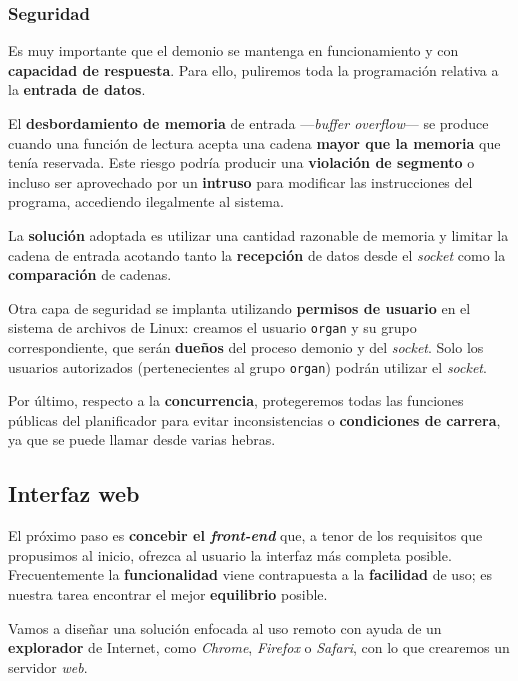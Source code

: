 \documentclass[10pt,a4paper]{article}
\begin{document}
	\subsubsection*{Seguridad}
	
	Es muy importante que el demonio se mantenga en funcionamiento y con \textbf{capacidad de respuesta}. Para ello, puliremos toda la programación relativa a la \textbf{entrada de datos}.
	
	El \textbf{desbordamiento de memoria} de entrada ---\textit{buffer overflow}--- se produce cuando una función de lectura acepta una cadena \textbf{mayor que la memoria} que tenía reservada. Este riesgo podría producir una \textbf{violación de segmento} o incluso ser aprovechado por un \textbf{intruso} para modificar las instrucciones del programa, accediendo ilegalmente al sistema.
	
	La \textbf{solución} adoptada es utilizar una cantidad razonable de memoria y limitar la cadena de entrada acotando tanto la \textbf{recepción} de datos desde el \textit{socket} como la \textbf{comparación} de cadenas.
	
	Otra capa de seguridad se implanta utilizando \textbf{permisos de usuario} en el sistema de archivos de Linux: creamos el usuario \verb|organ| y su grupo correspondiente, que serán \textbf{dueños} del proceso demonio y del \textit{socket}. Solo los usuarios autorizados (pertenecientes al grupo \verb|organ|) podrán utilizar el \textit{socket}.
	
	Por último, respecto a la \textbf{concurrencia}, protegeremos todas las funciones públicas del planificador para evitar inconsistencias o \textbf{condiciones de carrera}, ya que se puede llamar desde varias hebras.
	
	\subsection{Interfaz web}
	
	El próximo paso es \textbf{concebir el \textit{front-end}} que, a tenor de los requisitos que propusimos al inicio, ofrezca al usuario la interfaz más completa posible. Frecuentemente la \textbf{funcionalidad} viene contrapuesta a la \textbf{facilidad} de uso; es nuestra tarea encontrar el mejor \textbf{equilibrio} posible.
	
	Vamos a diseñar una solución enfocada al uso remoto con ayuda de un \textbf{explorador} de Internet, como \textit{Chrome}, \textit{Firefox} o \textit{Safari}, con lo que crearemos un servidor \textit{web}.
	
\end{document}

